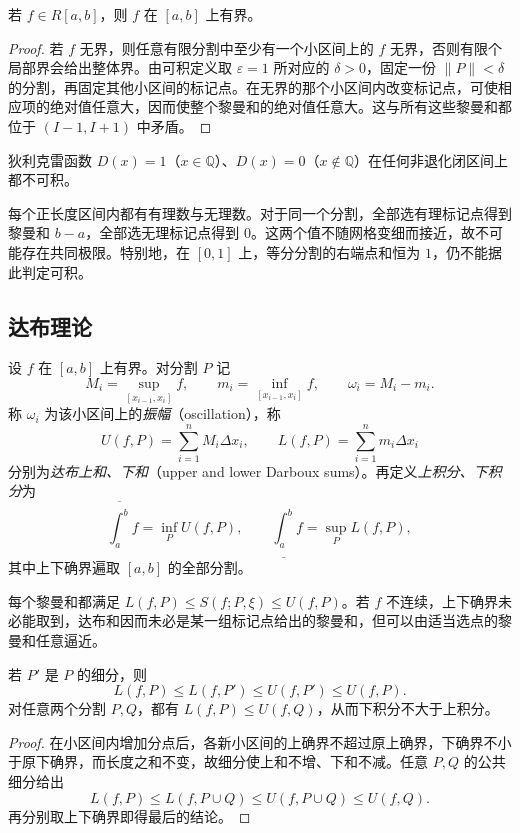 \begin{theorem}
\label{thm:riemann-integrable-implies-bounded}
若 $f\in R[a,b]$，则 $f$ 在 $[a,b]$ 上有界。
\end{theorem}
\begin{proof}
若 $f$ 无界，则任意有限分割中至少有一个小区间上的 $f$ 无界，否则有限个局部界会给出整体界。由可积定义取 $\varepsilon=1$ 所对应的 $\delta>0$，固定一份 $\|P\|<\delta$ 的分割，再固定其他小区间的标记点。在无界的那个小区间内改变标记点，可使相应项的绝对值任意大，因而使整个黎曼和的绝对值任意大。这与所有这些黎曼和都位于 $(I-1,I+1)$ 中矛盾。
\end{proof}

\begin{example}
\label{ex:dirichlet-function-not-riemann-integrable}
狄利克雷函数 $D(x)=1$（$x\in\mathbb Q$）、$D(x)=0$（$x\notin\mathbb Q$）在任何非退化闭区间上都不可积。
\end{example}
\begin{solve}
每个正长度区间内都有有理数与无理数。对于同一个分割，全部选有理标记点得到黎曼和 $b-a$，全部选无理标记点得到 $0$。这两个值不随网格变细而接近，故不可能存在共同极限。特别地，在 $[0,1]$ 上，等分分割的右端点和恒为 $1$，仍不能据此判定可积。
\end{solve}

\subsection{达布理论}
\label{subsec:darboux-theory}

\begin{definition}
\label{def:darboux-sums-and-integrals}
设 $f$ 在 $[a,b]$ 上有界。对分割 $P$ 记
\[
    M_i=\sup_{[x_{i-1},x_i]}f,\qquad
    m_i=\inf_{[x_{i-1},x_i]}f,\qquad \omega_i=M_i-m_i.
\]
称 $\omega_i$ 为该小区间上的\emph{振幅}（oscillation），称
\[
    U(f,P)=\sum_{i=1}^nM_i\Delta x_i,\qquad
    L(f,P)=\sum_{i=1}^nm_i\Delta x_i
\]
分别为\emph{达布上和、下和}（upper and lower Darboux sums）。再定义\emph{上积分、下积分}为
\[
    \overline{\int_a^b}f=\inf_P U(f,P),\qquad
    \underline{\int_a^b}f=\sup_P L(f,P),
\]
其中上下确界遍取 $[a,b]$ 的全部分割。
\end{definition}

每个黎曼和都满足 $L(f,P)\leq S(f;P,\xi)\leq U(f,P)$。若 $f$ 不连续，上下确界未必能取到，达布和因而未必是某一组标记点给出的黎曼和，但可以由适当选点的黎曼和任意逼近。

\begin{proposition}
\label{prop:darboux-refinement}
若 $P'$ 是 $P$ 的细分，则
\[
    L(f,P)\leq L(f,P')\leq U(f,P')\leq U(f,P).
\]
对任意两个分割 $P,Q$，都有 $L(f,P)\leq U(f,Q)$，从而下积分不大于上积分。
\end{proposition}
\begin{proof}
在小区间内增加分点后，各新小区间的上确界不超过原上确界，下确界不小于原下确界，而长度之和不变，故细分使上和不增、下和不减。任意 $P,Q$ 的公共细分给出
\[
    L(f,P)\leq L(f,P\cup Q)\leq U(f,P\cup Q)\leq U(f,Q).
\]
再分别取上下确界即得最后的结论。
\end{proof}

